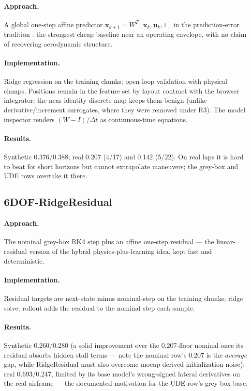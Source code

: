 \documentclass[11pt]{article}
\begin{document}
\paragraph{Approach.} A global one-step affine predictor
$\mathbf x_{k+1}=W^{T}[\mathbf x_k,\mathbf u_k,1]$ in the prediction-error
tradition \cite{ljung1999system}: the strongest cheap baseline near an
operating envelope, with no claim of recovering aerodynamic structure.
\paragraph{Implementation.} Ridge regression on the training chunks;
open-loop validation with physical clamps. Positions remain in the feature
set by layout contract with the browser integrator; the near-identity
discrete map keeps them benign (unlike derivative/increment surrogates,
where they were removed under R3). The model inspector renders
$(W-I)/\Delta t$ as continuous-time equations.
\paragraph{Results.} Synthetic 0.376/0.388; real 0.207 (4/17) and 0.142
(5/22). On real laps it is hard to beat for short horizons but cannot
extrapolate maneuvers; the grey-box and UDE rows overtake it there.

\subsection{6DOF-RidgeResidual}
\paragraph{Approach.} The nominal grey-box RK4 step plus an affine one-step
residual --- the linear-residual version of the hybrid physics-plus-learning
idea, kept fast and deterministic.
\paragraph{Implementation.} Residual targets are next-state minus
nominal-step on the training chunks; ridge solve; rollout adds the residual
to the nominal step each sample.
\paragraph{Results.} Synthetic 0.260/0.280 (a solid improvement over the
0.207-floor nominal once its residual absorbs hidden stall terms ---
note the nominal row's 0.207 is the \emph{average} gap, while RidgeResidual
must also overcome mocap-derived initialization noise); real 0.693/0.247,
limited by its base model's wrong-signed lateral derivatives on the real
airframe --- the documented motivation for the UDE row's grey-box base.
\end{document}
